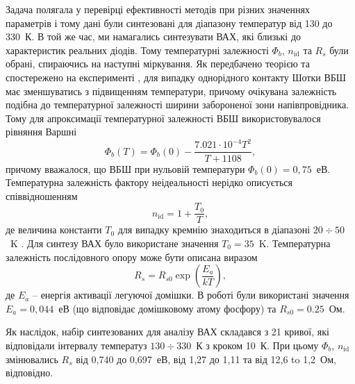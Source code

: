 Задача полягала у перевірці ефективності методів при різних значеннях параметрів і тому дані були синтезовані для діапазону температур від 130 до 330~К.
В той же час, ми намагались синтезувати ВАХ, які близькі до характеристик реальних діодів.
Тому температурні залежності $\Phi_b$, $n_\mathrm{id}$ та $R_s$ були обрані, спираючись на наступні міркування.
Як передбачено теорією \cite{Rhoderick1988} та спостережено на експерименті \cite{Aboelfotoh,Zhua},
для випадку однорідного контакту Шотки ВБШ має зменшуватись з підвищенням температури, причому очікувана залежність подібна до температурної залежності ширини забороненої зони напівпровідника.
Тому для апроксимації температурної залежності ВБШ використовувалося рівняння Варшні \cite{SiEg2012}
\begin{equation}
\label{eqFbT}
\Phi_b(T) = \Phi_b(0) - \frac{7.021\cdot10^{-4} T^2}{T + 1108} ,
\end{equation}
причому вважалося, що ВБШ при нульовій температури $\Phi_b(0)=0,75$~еВ.
Температурна залежність фактору неідеальності нерідко описується співвідношенням
\begin{equation}
\label{eqnT}
n_\mathrm{id}=1+\frac{T_0}{T},
\end{equation}
де величина константи $T_0$ для випадку кремнію знаходиться в діапазоні $20\div50$~K \cite{T0:Lee,T0:McCafferty,T0:Saxena,Aboelfotoh}.
Для синтезу ВАХ було використане значення $T_0=35$~K.
Температурна залежність послідовного опору може бути описана виразом \cite{Sze1985,Rs:Meyaard,Rs:Kang}
\begin{equation}
\label{eqRsT}
R_s=R_{s0}\exp\left(\frac{E_a}{kT}\right),
\end{equation}
де $E_a$ -- енергія активації легуючої домішки.
В роботі були використані значення $E_a=0,044$~еВ (що відповідає домішковому атому фосфору) та $R_{s0}=0.25$~Ом.

Як наслідок, набір синтезованих для аналізу ВАХ складався з 21 кривої, які відповідали інтервалу температуз $130\div330$~К з кроком 10~К.
При цьому  $\Phi_b$, $n_\mathrm{id}$ змінювались $R_s$ від 0,740 до 0,697~еВ, від 1,27 до 1,11 та від 12,6 to 1,2~Ом, відповідно.


